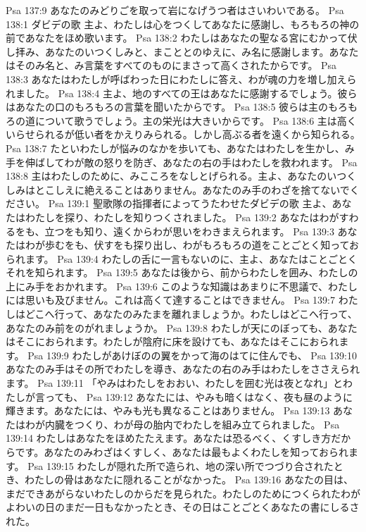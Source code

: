 Psa 137:9  あなたのみどりごを取って岩になげうつ者はさいわいである。
Psa 138:1  ダビデの歌 主よ、わたしは心をつくしてあなたに感謝し、もろもろの神の前であなたをほめ歌います。
Psa 138:2  わたしはあなたの聖なる宮にむかって伏し拝み、あなたのいつくしみと、まこととのゆえに、み名に感謝します。あなたはそのみ名と、み言葉をすべてのものにまさって高くされたからです。
Psa 138:3  あなたはわたしが呼ばわった日にわたしに答え、わが魂の力を増し加えられました。
Psa 138:4  主よ、地のすべての王はあなたに感謝するでしょう。彼らはあなたの口のもろもろの言葉を聞いたからです。
Psa 138:5  彼らは主のもろもろの道について歌うでしょう。主の栄光は大きいからです。
Psa 138:6  主は高くいらせられるが低い者をかえりみられる。しかし高ぶる者を遠くから知られる。
Psa 138:7  たといわたしが悩みのなかを歩いても、あなたはわたしを生かし、み手を伸ばしてわが敵の怒りを防ぎ、あなたの右の手はわたしを救われます。
Psa 138:8  主はわたしのために、みこころをなしとげられる。主よ、あなたのいつくしみはとこしえに絶えることはありません。あなたのみ手のわざを捨てないでください。
Psa 139:1  聖歌隊の指揮者によってうたわせたダビデの歌 主よ、あなたはわたしを探り、わたしを知りつくされました。
Psa 139:2  あなたはわがすわるをも、立つをも知り、遠くからわが思いをわきまえられます。
Psa 139:3  あなたはわが歩むをも、伏すをも探り出し、わがもろもろの道をことごとく知っておられます。
Psa 139:4  わたしの舌に一言もないのに、主よ、あなたはことごとくそれを知られます。
Psa 139:5  あなたは後から、前からわたしを囲み、わたしの上にみ手をおかれます。
Psa 139:6  このような知識はあまりに不思議で、わたしには思いも及びません。これは高くて達することはできません。
Psa 139:7  わたしはどこへ行って、あなたのみたまを離れましょうか。わたしはどこへ行って、あなたのみ前をのがれましょうか。
Psa 139:8  わたしが天にのぼっても、あなたはそこにおられます。わたしが陰府に床を設けても、あなたはそこにおられます。
Psa 139:9  わたしがあけぼのの翼をかって海のはてに住んでも、
Psa 139:10  あなたのみ手はその所でわたしを導き、あなたの右のみ手はわたしをささえられます。
Psa 139:11  「やみはわたしをおおい、わたしを囲む光は夜となれ」とわたしが言っても、
Psa 139:12  あなたには、やみも暗くはなく、夜も昼のように輝きます。あなたには、やみも光も異なることはありません。
Psa 139:13  あなたはわが内臓をつくり、わが母の胎内でわたしを組み立てられました。
Psa 139:14  わたしはあなたをほめたたえます。あなたは恐るべく、くすしき方だからです。あなたのみわざはくすしく、あなたは最もよくわたしを知っておられます。
Psa 139:15  わたしが隠れた所で造られ、地の深い所でつづり合されたとき、わたしの骨はあなたに隠れることがなかった。
Psa 139:16  あなたの目は、まだできあがらないわたしのからだを見られた。わたしのためにつくられたわがよわいの日のまだ一日もなかったとき、その日はことごとくあなたの書にしるされた。
